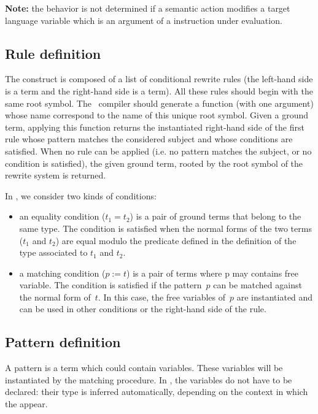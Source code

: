 \noindent
\textbf{Note:} the behavior is not determined if a semantic action
modifies a target language variable which is an argument of a
 instruction under evaluation.

\subsection{Rule definition}
The  construct is composed of a list of conditional
rewrite rules (the left-hand side is a term and the right-hand side is
a term). All these rules should begin with the same root symbol. The
\TOM\ compiler should generate a function (with one argument) whose
name correspond to the name of this unique root symbol.
Given a ground term, applying this function returns the instantiated
right-hand side of the first rule whose pattern matches the considered 
subject and whose conditions are satisfied.
When no rule can be applied (i.e. no pattern matches the subject, or
no condition is satisfied), the given ground term, rooted by the root
symbol of the rewrite system is returned.

In \TOM, we consider two kinds of conditions:
\begin{itemize}
\item an equality condition ($t_1 = t_2$) is a pair of ground terms that
  belong to the same type.
  The condition is satisfied when the normal forms of the two terms
  ($t_1$ and $t_2$) are equal modulo the  predicate defined in
  the definition of the type associated to $t_1$ and $t_2$.
\item a matching condition ($p := t$) is a pair of terms where p may
  contains free variable. The condition is satisfied if the pattern~$p$
  can be matched against the normal form of~$t$. In this case, the
  free variables of~$p$ are instantiated and can be used in other
  conditions or the right-hand side of the rule.
\end{itemize}


\subsection{Pattern definition}
A pattern is a term which could contain variables. These variables
will be instantiated by the matching procedure.
In \TOM, the variables do not have to be declared: their type is
inferred automatically, depending on the context in which the appear.

